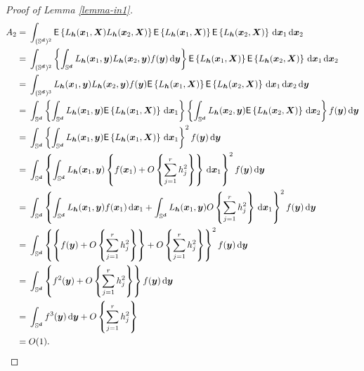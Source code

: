 \documentclass[oneside,11pt]{article}
\begin{document}
\begin{proof}[Proof of Lemma \ref{lemma-in1}]
\begin{align*}
    A_2=&\;\int_{(\Sr)^2} \mathsf{E} \lrb{{L}_{\bh} (\bx_1,\bX){L}_{\bh} (\bx_2,\bX)}\mathsf{E}\lrb{{L}_{\bh} (\bx_1,\bX)}\mathsf{E}\lrb{{L}_{\bh} (\bx_2,\bX)} \,\rd \bx_1 \,\rd \bx_2 \\
    =&\; \int_{(\Sr)^2} \lrb{\int_{\Sr} {L}_{\bh} (\bx_1,\by){L}_{\bh} (\bx_2,\by) f(\by)\,\rd \by} \mathsf{E}\lrb{{L}_{\bh} (\bx_1,\bX)}\mathsf{E}\lrb{{L}_{\bh} (\bx_2,\bX)} \,\rd \bx_1 \,\rd \bx_2 \\
    =&\; \int_{(\Sr)^3} {L}_{\bh} (\bx_1,\by){L}_{\bh} (\bx_2,\by) f(\by) \mathsf{E}\lrb{{L}_{\bh} (\bx_1,\bX)}\mathsf{E}\lrb{{L}_{\bh} (\bx_2,\bX)} \,\rd \bx_1 \,\rd \bx_2 \,\rd \by \\
    =&\; \int_{\Sr} \lrb{\int_{\Sr} {L}_{\bh} (\bx_1,\by) \mathsf{E}\lrb{{L}_{\bh} (\bx_1,\bX)} \,\rd \bx_1} \lrb{\int_{\Sr} {L}_{\bh} (\bx_2,\by) \mathsf{E}\lrb{{L}_{\bh} (\bx_2,\bX)} \,\rd \bx_2}  f(\by) \,\rd \by \\
    =&\; \int_{\Sr} \lrb{\int_{\Sr} {L}_{\bh} (\bx_1,\by) \mathsf{E}\lrb{{L}_{\bh} (\bx_1,\bX)} \,\rd \bx_1}^2  f(\by) \,\rd \by \\
    =&\; \int_{\Sr} \lrb{\int_{\Sr} {L}_{\bh} (\bx_1,\by) \lrb{f(\bx_1)+O\lrb{\sum_{j=1}^{r}h_j^2}} \,\rd \bx_1}^2  f(\by) \,\rd \by \\
    =&\; \int_{\Sr} \lrb{\int_{\Sr} {L}_{\bh} (\bx_1,\by) f(\bx_1) \,\rd \bx_1 + \int_{\Sr} {L}_{\bh} (\bx_1,\by) O\lrb{\sum_{j=1}^{r}h_j^2} \,\rd \bx_1}^2  f(\by) \,\rd \by \\
    =&\; \int_{\Sr} \lrb{\lrb{f(\by)+O\lrb{\sum_{j=1}^{r}h_j^2}} + O\lrb{\sum_{j=1}^{r}h_j^2}}^2  f(\by) \,\rd \by \\
     =&\; \int_{\Sr} \lrb{f^2(\by) + O\lrb{\sum_{j=1}^{r}h_j^2}}  f(\by) \,\rd \by \\
     =&\; \int_{\Sr} f^3(\by) \,\rd \by  + O\lrb{\sum_{j=1}^{r}h_j^2} \\
     =&\; O(1).
\end{align*}

\end{proof}
\end{document}
